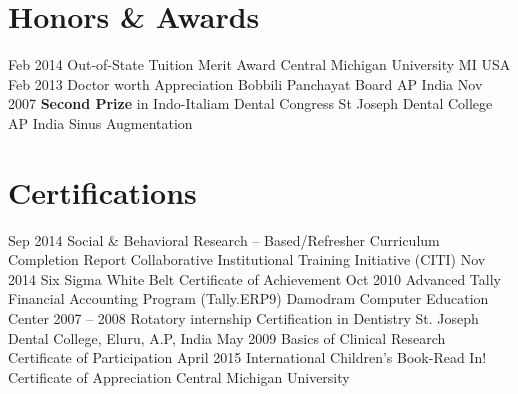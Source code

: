 \documentclass[]{friggeri-cv} %
\begin{document}
\section{Honors \& Awards}
\begin{entrylist}
\entry
{Feb 2014}
{Out-of-State Tuition Merit Award}
{Central Michigan University MI USA}
{}
\entry
{Feb 2013}
{Doctor worth Appreciation}
{Bobbili Panchayat Board AP India}
{}
\entry
{Nov 2007}
{{\bf Second Prize } in Indo-Italiam Dental Congress}
{St Joseph Dental College AP India}
{Sinus Augmentation}
\end{entrylist}
\newpage
\section{Certifications}
\begin{entrylist}
\entry
{Sep 2014}
{Social \& Behavioral Research -- Based/Refresher Curriculum Completion Report}
{}
{Collaborative Institutional Training Initiative (CITI)}
\entry
{Nov 2014}
{Six Sigma White Belt Certificate of Achievement}
{}
{}
\entry
{Oct 2010}
{Advanced Tally Financial Accounting  Program (Tally.ERP9)}
{Damodram Computer Education Center}
{}
\entry
{2007 -- 2008}
{Rotatory internship Certification in Dentistry}
{St. Joseph Dental College, Eluru, A.P, India}
{}
\entry
{May 2009}
{Basics of Clinical Research}
{Certificate of Participation}
{}
\entry
{April 2015}
{International Children's Book-Read In!}
{Certificate of Appreciation}
{Central Michigan University}
\end{entrylist}
\end{document}
